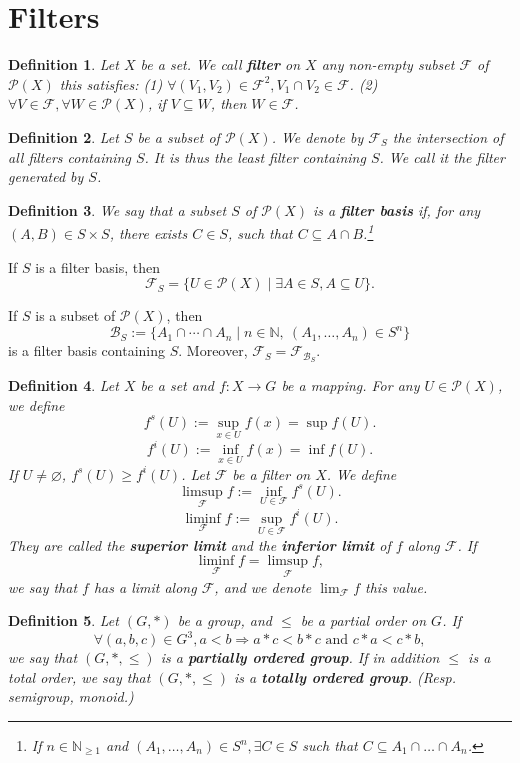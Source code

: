 \documentclass{article}
\theoremstyle{1}
\newtheorem{definition}{Definition}[section]
\newcommand{\NN}{\mathbb{N}} %
\begin{document}
\section{Filters}
\begin{definition}
    Let $X$ be a set. We call \textbf{filter} on $X$ any non-empty subset $\mathcal{F}$ of $\mathscr{P}(X)$ this satisfies:
    \newline
    (1) $\forall(V_1,V_2)\in \mathcal{F}^2, V_1\cap V_2\in \mathcal{F}$.
    \newline
    (2) $ \forall V\in \mathcal{F}, \forall W\in \mathscr{P}(X)$, if $V\subseteq W$, then $W\in \mathcal{F}$.
\end{definition}
\begin{definition}
    Let $S$ be a subset of $\mathscr{P}(X)$. We denote by $\mathcal{F}_S$ the intersection of all filters containing $S$. It is thus the least filter containing $S$. We call it the filter generated by $S$.
\end{definition}
\begin{definition}
    We say that a subset $S$ of $\mathscr{P}(X)$ is a \textbf{filter basis} if, for any $(A,B)\in S\times S$, there exists $C\in S$, such that $C\subseteq A\cap B$.\footnote{If $n\in \NN_{\ge 1}$ and $(A_1,\dots,A_n)\in S^n,\exists C\in S$ such that $C\subseteq A_1\cap \dots\cap A_n$.}
\end{definition}

    If $S$ is a filter basis, then 
    $$\mathcal{F}_S=\{U\in \mathscr{P}(X)\mid \exists A\in S, A\subseteq U\}.$$
    
    If $S$ is a subset of $\mathscr{P}(X)$, then 
    $$\mathcal{B}_S:=\{A_1\cap \cdots \cap A_n\mid n\in \NN,\ (A_1,\dots,A_n)\in S^n\}$$
    is a filter basis containing $S$. Moreover, $\mathcal{F}_S=\mathcal{F}_{\mathcal{B}_S}$.
\begin{definition}
    Let $X$ be a set and $f:X\longrightarrow G$ be a mapping. For any $U\in \mathscr{P}(X)$, we define 
    $$f^s(U):=\sup_{x\in U}f(x)=\sup f(U).$$
    $$f^i(U):=\inf_{x\in U}f(x)=\inf f(U).$$
    If $U\not=\varnothing$, $f^s(U)\ge f^i(U)$. Let $\mathcal{F}$ be a filter on $X$. We define 
    $$\limsup_\mathcal{F} f:=\inf_{U\in \mathcal{F}} f^s(U).$$
    $$\liminf_\mathcal{F} f:=\sup_{U\in \mathcal{F}} f^i(U).$$
    They are called the \textbf{superior limit} and the \textbf{inferior limit} of $f$ along $\mathcal{F}$. If 
    $$\liminf_\mathcal{F} f=\limsup_\mathcal{F} f,$$
    we say that $f$ has a limit along $\mathcal{F}$, and we denote $\displaystyle \lim_{\mathcal{F}}f$ this value.
\end{definition}
\begin{definition}
    Let $(G,*)$ be a group, and $\le $ be a partial order on $G$. If 
    $$\forall (a,b,c)\in G^3,a<b\Rightarrow a*c<b*c \text{ and } c*a<c*b,$$
    we say that $(G,*,\le)$ is a \textbf{partially ordered group}. If in addition $\le $ is a total order, we say that $(G,*,\le)$ is a \textbf{totally ordered group}. (Resp. semigroup, monoid.)
\end{definition}
\end{document}
